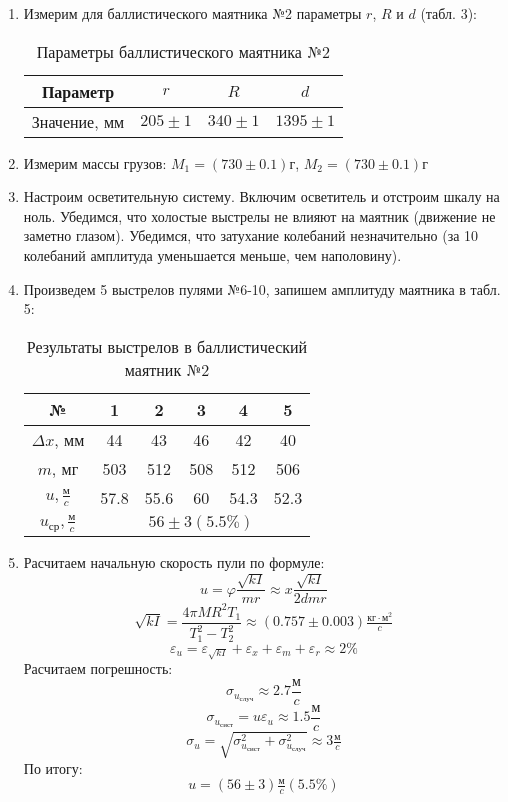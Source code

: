 \documentclass[a4paper, 10pt]{article}%
\begin{document}
\begin{enumerate}
		\item Измерим для баллистического маятника №2 параметры $r$, $R$ и $d$ (табл. 3):
		\begin{table}[h]
			\centering
			\caption{Параметры баллистического маятника №2}
			\begin{tabular}{|c|c|c|c|}
				\hline
				Параметр & $r$ & $R$ & $d$ \\
				\hline
				Значение, мм & $205 \pm 1$ & $340 \pm 1$ & $1395 \pm 1$ \\
				\hline
			\end{tabular}
		\end{table}
		
		\item Измерим массы грузов: $M_1 = \left(730 \pm 0.1\right) \text{г}$, $M_2 = \left(730 \pm 0.1\right) \text{г}$
		\item Настроим осветительную систему. Включим осветитель и отстроим шкалу на ноль. Убедимся, что холостые выстрелы не влияют на маятник (движение не заметно глазом). Убедимся, что затухание колебаний незначительно (за 10 колебаний амплитуда уменьшается меньше, чем наполовину).
		
		
		\item Произведем 5 выстрелов пулями №6-10, запишем амплитуду маятника в табл. 5:
		\begin{table}[h]
			\centering
			\caption{Результаты выстрелов в баллистический маятник №2}
			\begin{tabular}{|c|c|c|c|c|c|}
				\hline
				№ & 1 & 2 & 3 & 4 & 5 \\
				\hline
				$\Delta x$, мм & 44 & 43 & 46 & 42 & 40 \\
				\hline
				$m$, мг & 503 & 512 & 508 & 512 & 506 \\
				\hline
				$u, \frac{\text{м}}{c}$ & 57.8 & 55.6 & 60 & 54.3 & 52.3 \\
				\hline
				$u_\text{ср}, \frac{\text{м}}{c}$ & \multicolumn{5}{|c|}{\bf{$56 \pm 3 \left(5.5\%\right)$}} \\
				\hline
			\end{tabular}
		\end{table}
		\item Расчитаем начальную скорость пули по формуле:
		\[u = \varphi\dfrac{\sqrt{kI}}{mr} \approx x\dfrac{\sqrt{kI}}{2dmr}\]
		\[\sqrt{kI} = \dfrac{4\pi MR^2T_1}{T_1^2-T_2^2} \approx (0.757 \pm 0.003) \tfrac{\text{кг}\cdot\text{м}^2}{c}\]
		\[\varepsilon_u = \varepsilon_{\sqrt{kI}} + \varepsilon_x + \varepsilon_m + \varepsilon_r \approx 2\%\]
		Расчитаем погрешность:
		\[\sigma_{u_\text{случ}} \approx 2.7 \frac{\text{м}}{c}\]
		\[\sigma_{u_\text{сист}} = u\varepsilon_u \approx 1.5 \frac{\text{м}}{c}\]
		\[\sigma_u = \sqrt{\sigma_{u_\text{сист}}^2+\sigma_{u_\text{случ}}^2} \approx 3 \tfrac{\text{м}}{c}\]
		По итогу:
		\[u = \left(56 \pm 3\right) \tfrac{\text{м}}{c} (5.5\%)\]
	\end{enumerate}
\end{document}
